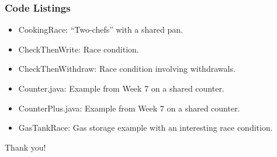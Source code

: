 \documentclass[xcolor={dvipsnames,svgnames},aspectratio=169]{beamer}
\begin{document}
\begin{frame}[fragile]
  \frametitle{Code Listings}

  \begin{itemize}
  \item[\faCode]<1-> CookingRace: ``Two-chefs'' with a shared pan.
  \item[\faCode]<1-> CheckThenWrite: Race condition.
  \item[\faCode]<1-> CheckThenWithdraw: Race condition involving withdrawals.
  \item[\faCode]<1-> Counter.java: Example from Week 7 on a shared counter.
  \item[\faCode]<1-> CounterPlus.java: Example from Week 7 on a shared counter.
  \item[\faCode]<1-> GasTankRace: Gas storage example with an interesting race
    condition.
  \end{itemize}
\end{frame}

\begin{frame}{}
  \centering \huge
  Thank you!
\end{frame}
\end{document}
